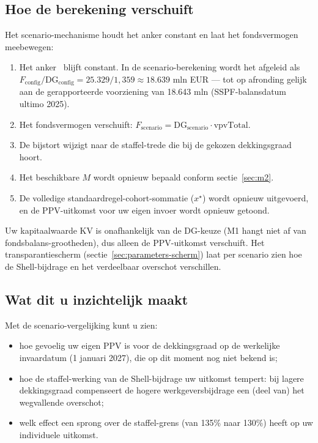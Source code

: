 \documentclass[11pt,a4paper]{article}
\newcommand{\vpvTotal}{\text{vpvTotal}}
\newcommand{\dG}{\text{DG}}
\begin{document}
\subsection{Hoe de berekening verschuift}

Het scenario-mechanisme houdt het anker constant en laat het fondsvermogen meebewegen:

\begin{enumerate}
\item Het anker \vpvTotal\ blijft constant. In de scenario-berekening wordt het afgeleid als $F_{\text{config}} / \dG_{\text{config}} = 25.329 / 1{,}359 \approx 18.639$ mln EUR --- tot op afronding gelijk aan de gerapporteerde voorziening van 18.643 mln (SSPF-balansdatum ultimo 2025).
\item Het fondsvermogen verschuift: $F_{\text{scenario}} = \dG_{\text{scenario}} \cdot \vpvTotal$.
\item De bijstort wijzigt naar de staffel-trede die bij de gekozen dekkingsgraad hoort.
\item Het beschikbare $M$ wordt opnieuw bepaald conform sectie~\ref{sec:m2}.
\item De volledige standaardregel-cohort-sommatie ($x^{\star}$) wordt opnieuw uitgevoerd, en de PPV-uitkomst voor uw eigen invoer wordt opnieuw getoond.
\end{enumerate}

Uw kapitaalwaarde KV is onafhankelijk van de DG-keuze (M1 hangt niet af van fondsbalans-grootheden), dus alleen de PPV-uitkomst verschuift. Het transparantiescherm (sectie~\ref{sec:parameters-scherm}) laat per scenario zien hoe de Shell-bijdrage en het verdeelbaar overschot verschillen.

\subsection{Wat dit u inzichtelijk maakt}

Met de scenario-vergelijking kunt u zien:
\begin{itemize}
\item hoe gevoelig uw eigen PPV is voor de dekkingsgraad op de werkelijke invaardatum (1 januari 2027), die op dit moment nog niet bekend is;
\item hoe de staffel-werking van de Shell-bijdrage uw uitkomst tempert: bij lagere dekkingsgraad compenseert de hogere werkgeversbijdrage een (deel van) het wegvallende overschot;
\item welk effect een sprong over de staffel-grens (van 135\% naar 130\%) heeft op uw individuele uitkomst.
\end{itemize}
\end{document}

